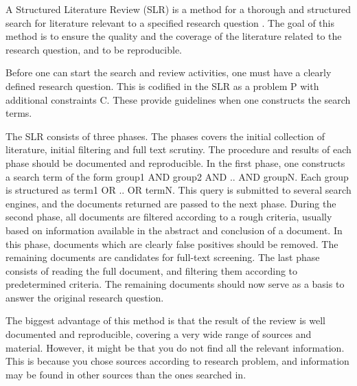 
A Structured Literature Review (SLR) is a method for a thorough and structured search for literature relevant to a specified research question \cite{Kofod2011}.  The goal of this method is to ensure the quality and the coverage of the literature related to the research question, and to be reproducible.

Before one can start the search and review activities, one must have a clearly defined research question.  This is codified in the SLR as a problem P with additional constraints C.  These provide guidelines when one constructs the search terms.

The SLR consists of three phases. The phases covers the initial collection of literature, initial filtering and full text scrutiny.  The procedure and results of each phase should be documented and reproducible.  In the first phase, one constructs a search term of the form group1 AND group2 AND .. AND groupN.  Each group is structured as term1 OR .. OR termN.  This query is submitted to several search engines, and the documents returned are passed to the next phase.  During the second phase, all documents are filtered according to a rough criteria, usually based on information available in the abstract and conclusion of a document.  In this phase, documents which are clearly false positives should be removed.  The remaining documents are candidates for full-text screening.  The last phase consists of reading the full document, and filtering them according to predetermined criteria.  The remaining documents should now serve as a basis to answer the original research question.

The biggest advantage of this method is that the result of the review is well documented and reproducible, covering a very wide range of sources and material. However, it might be that you do not find all the relevant information. This is because you chose sources according to research problem, and information may be found in other sources than the ones searched in.